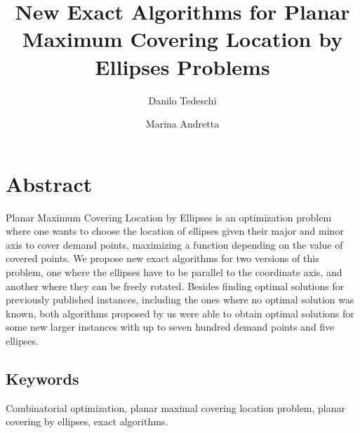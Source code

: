 \documentclass[3p, 11pt]{elsarticle}
\begin{document}
	
	\begin{frontmatter}
		
		
		\title{New Exact Algorithms for Planar Maximum Covering Location by Ellipses Problems}
		
		\author[add1]{Danilo Tedeschi}

		
		\author[add1]{Marina Andretta}
					
		\address[add1]{Department of Applied Mathematics and Statistics, Institute of Mathematical and Computer Sciences, University of São Paulo, Avenida Trabalhador São-carlense, 400, Centro, 13566-590, São Carlos, SP, Brazil.}
		
\end{frontmatter}
\clearpage

\section*{Abstract}
			
			{\color{Red}
		Planar Maximum Covering Location by Ellipses is an optimization problem where one wants to choose the location of ellipses given their major and minor axis to cover demand points, maximizing a function depending on the value of covered points.	
		}We propose new exact algorithms for two versions of this problem, one where the ellipses have to be parallel to the coordinate axis, and another where they can be freely rotated. 
			Besides finding optimal solutions for previously published instances, including the ones where no optimal solution was known, both algorithms proposed by us were able to obtain optimal solutions for some new larger instances 	with up to seven hundred demand points and five ellipses.
\subsection*{Keywords}
			Combinatorial optimization, planar maximal covering location problem, planar covering by ellipses, exact algorithms.
			
			
\end{document}
